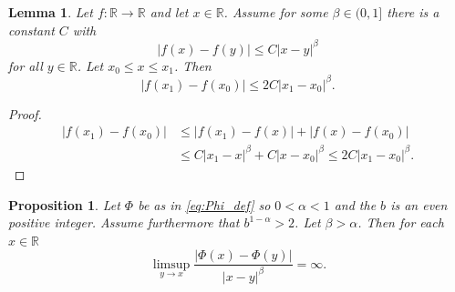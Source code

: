 \documentclass[12pt]{amsart}
\numberwithin{equation}{section}
\newcommand{\R}{{\mathbb R}}		%
\newcommand{\cn}{\colon}                %
\newtheorem{lemma}[thm]{Lemma}
\newtheorem{prop}[thm]{Proposition}
\theoremstyle{definition}
\theoremstyle{remark}
\begin{document}
\begin{lemma}\label{lem:a<x<b}
    Let $f\cn \R \to \R$ and let $x\in \R$.  Assume for some
    $\beta\in (0,1]$ there is a constant $C$ with
    $$
    |f(x)-f(y)| \le C |x-y|^\beta
    $$
    for  all $y\in \R$.  Let $x_0\le x \le x_1$.  Then
    $$
    |f(x_1)-f(x_0)| \le 2C |x_1-x_0|^\beta.
    $$
\end{lemma}

\begin{proof}
    \begin{align*}
    |f(x_1) - f(x_0)|&\le |f(x_1)-f(x)|+ |f(x)-f(x_0)|\\ 
                 &\le C|x_1-x|^\beta + C |x-x_0|^\beta \le 2C|x_1-x_0|^\beta.
    \end{align*}
\end{proof}

\begin{prop}\label{prop:sup=infty}
  Let $\Phi$ be as in \eqref{eq:Phi_def} so  $0<\alpha<1$ and the 
  $b$ is an even positive integer.  
  Assume furthermore that  $b^{1-\alpha}>2$. 
  Let  $\beta > \alpha$.   Then for each $x\in\R$ 
$$
\limsup_{y\to x} \frac{|\Phi(x)-\Phi(y)|}{|x-y|^\beta} = \infty.
$$
\end{prop}
\end{document}
